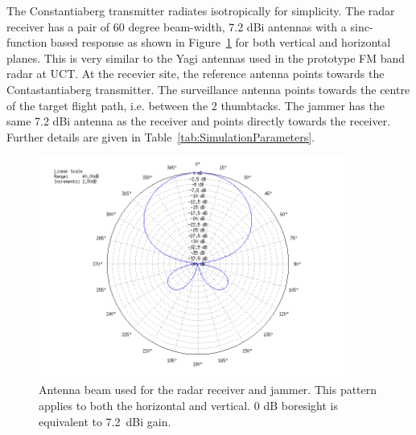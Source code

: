 \documentclass[english, 12pt]{report}
\begin{document}
The Constantiaberg transmitter radiates isotropically for simplicity. The radar receiver has a pair of 60 degree beam-width, 7.2 dBi antennas with a sinc-function based response as shown in Figure~\ref{fig:AntennaBeam} for both vertical and horizontal planes. This is very similar to the Yagi antennas used in the prototype FM band radar at UCT. At the recevier site, the reference antenna points towards the Contastantiaberg transmitter. The surveillance antenna points towards the centre of the target flight path, i.e. between the 2 thumbtacks. The jammer has the same 7.2 dBi antenna as the receiver and points directly towards the receiver. Further details are given in Table~\ref{tab:SimulationParameters}.

\begin{figure}[htbp]
\begin{center}
\includegraphics[width=0.9\textwidth]{figs/Simulations/AntennaBeam.png}
\caption[Antenna pattern used in jamming simulations.]{Antenna beam used for the radar receiver and jammer. This pattern applies to both the horizontal and vertical. 0 dB boresight is equivalent to 7.2~dBi gain.}
\label{fig:AntennaBeam}
\end{center}
\end{figure}
\end{document}
